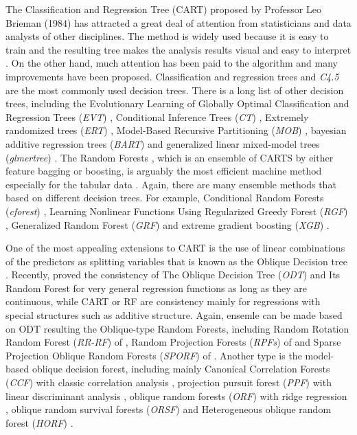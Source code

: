 \documentclass[nojss]{jss}
\numberwithin{equation}{section}
\begin{document}
The Classification and Regression Tree (CART) proposed by Professor Leo Brieman (1984) has attracted a great deal of attention from statisticians and data analysts of other disciplines. The method is widely used because it is easy to train and the resulting tree makes the analysis results visual and easy to interpret \citep{2014Learning}. On the other hand, much attention has been paid to the algorithm and many improvements have been proposed. Classification and regression trees  \cite[CART]{quinlan1987decision} and \emph{C4.5} \cite{quinlan1993program} are the most commonly used decision trees. There is a long list of other decision trees, including the Evolutionary Learning of Globally Optimal Classification and Regression Trees (\emph{EVT}) \cite{Grubinger2014ectree},  Conditional Inference Trees (\emph{CT}) \cite{hothorn2006unbiased}, Extremely randomized trees (\emph{ERT}) \cite{2006Extremely}, Model-Based Recursive Partitioning (\emph{MOB}) \cite{zeileis2015parties}, bayesian additive regression trees (\emph{BART}) \cite{maia2022gp} and generalized linear mixed-model trees (\emph{glmertree}) \cite{2020Generalized}.  The Random Forests \citep[RF]{breiman2001random}, which is an ensemble of CARTS by either feature bagging or boosting,   is arguably the most efficient machine method especially for the tabular data \cite{tabularDATA}. Again, there are many ensemble methods that based on different decision trees. For example, Conditional Random Forests (\emph{cforest}) \cite{hothorn2006unbiased}, Learning Nonlinear Functions Using Regularized Greedy Forest (\emph{RGF}) \cite{2014Learning}, Generalized Random Forest (\emph{GRF}) \cite{athey2019generalized} and extreme gradient boosting (\emph{XGB}) \cite{chen2016xgboost}.


One of the most appealing extensions to CART is the use of linear combinations of the predictors as splitting variables that is known as the Oblique Decision tree \cite{Heath93inductionof}. Recently, \cite{zhan2022consistency} proved the consistency of The Oblique Decision Tree (\emph{ODT}) and Its Random Forest for very general regression functions as long as they are continuous, while CART or RF are consistency mainly for regressions with special structures such as additive structure.  Again, ensemle can be made based on ODT resulting the Oblique-type Random Forests, including Random Rotation Random Forest (\emph{RR-RF}) of \cite{blaser2016random}, Random Projection Forests (\emph{RPFs}) of \cite{lee2015fast} and Sparse Projection Oblique Random Forests (\emph{SPORF}) of \cite{tomita2020sparse}. Another type is the model-based oblique decision forest,  including mainly Canonical Correlation Forests (\emph{CCF}) with classic correlation analysis \cite{rainforth2015canonical},  projection pursuit forest (\emph{PPF}) with linear discriminant analysis \cite{silva2021projection}, oblique random forests (\emph{ORF}) with ridge regression \cite{menze2011oblique}, oblique random survival forests (\emph{ORSF}) \cite{jaeger2022accelerated} and Heterogeneous oblique random forest (\emph{HORF}) \cite{katuwal2020heterogeneous}.
\end{document}
